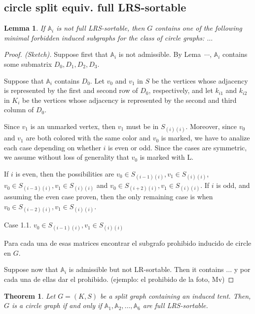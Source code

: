 \documentclass[a4paper,10pt]{report}
\theoremstyle{plain}
\newtheorem{teo}{Theorem}[chapter]
\newtheorem{lema}{Lemma}
\theoremstyle{remark}
\theoremstyle{plain}
\begin{document}
{%

                
\subsection{circle split equiv. full LRS-sortable}

\begin{lema} 
	If $\mathbb A_i$ is not full LRS-sortable, then $G$ contains one of the following minimal forbidden induced subgraphs for the class of circle graphs: $\ldots$
\end{lema}

\begin{proof}[Proof. (Sketch)] 

Suppose first that $\mathbb A_i$ is not admissible. By Lema~$\cdots$, $\mathbb A_i$ contains some submatrix $D_0,D_1,D_2,D_3$. 

Suppose that $\mathbb A_i$ contains $D_0$. Let $v_0$ and $v_1$ in $S$ be the vertices whose adjacency is represented by the first and second row of $D_0$, respectively, and let $k_{i1}$ and $k_{i2}$ in $K_i$ be the vertices whose adjacency is represented by the second and third column of $D_0$.


Since $v_1$ is an unmarked vertex, then $v_1$ must be in $S_{(i)(i)}$. Moreover, since $v_0$ and $v_1$ are both colored with the same color and $v_0$ is marked, we have to analize each case depending on whether $i$ is even or odd. 
Since the cases are symmetric, we assume without loss of generality that $v_0$ is marked with L.

If $i$ is even, then the possibilities are $v_0 \in S_{(i-1)(i)}, v_1 \in S_{(i)(i)}$, $v_0 \in S_{(i-3)(i)}, v_1 \in S_{(i)(i)}$ and $v_0 \in S_{(i+2)(i)}, v_1 \in S_{(i)(i)}$.
If $i$ is odd, and assuming the even case proven, then the only remaining case is when $v_0 \in S_{(i-2)(i)}, v_1 \in S_{(i)(i)}$.

Case 1.1. $v_0 \in S_{(i-1)(i)}, v_1 \in S_{(i)(i)}$



Para cada una de esas matrices encontrar el subgrafo prohibido inducido de circle en $G$.

Suppose now that $\mathbb A_i$ is admissible but not LR-sortable. Then it contains ... y por cada una de ellas dar el prohibido. (ejemplo: el prohibido de la foto, Mv)\end{proof}

\begin{teo} 
	Let $G=(K,S)$ be a split graph containing an induced tent. Then, $G$ is a circle graph if and only if $\mathbb A_1,\mathbb A_2,\ldots,\mathbb A_6$ are full LRS-sortable.
\end{teo}

}
\end{document}
